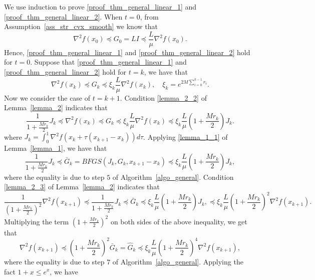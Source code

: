 \documentclass[11pt]{article}
\numberwithin{assumption}{section}
\numberwithin{remark}{section}
\numberwithin{theorem}{section}
\begin{document}
We use induction to prove \eqref{proof_thm_general_linear_1} and \eqref{proof_thm_general_linear_2}. When $t = 0$, from Assumption~\ref{ass_str_cvx_smooth} we know that
\begin{equation}
\nabla^2{f(x_0)} \preceq G_0 = LI \preceq \frac{L}{\mu}\nabla^2{f(x_0)}.
\end{equation}
Hence, \eqref{proof_thm_general_linear_1} and \eqref{proof_thm_general_linear_2} hold for $t = 0$. Suppose that \eqref{proof_thm_general_linear_1} and \eqref{proof_thm_general_linear_2} hold for $t = k$, we have that
\begin{equation}\label{proof_thm_general_linear_3}
    \nabla^2{f(x_k)} \preceq G_k \preceq \xi_k \frac{L}{\mu}\nabla^2{f(x_k)},\quad \xi_k = e^{2M\sum_{i = 0}^{k - 1}r_i}.
\end{equation}
Now we consider the case of $t = k + 1$. Condition \eqref{lemma_2_2} of Lemma~\ref{lemma_2} indicates that
\begin{equation}
    \frac{1}{1 + \frac{Mr_k}{2}}J_k \preceq \nabla^2{f(x_k)} \preceq G_k \preceq \xi_k \frac{L}{\mu}\nabla^2{f(x_k)} \preceq \xi_k \frac{L}{\mu}(1 + \frac{Mr_k}{2})J_k.
\end{equation}
where $J_k = \int_{0}^{1}\nabla^2{f(x_k + \tau(x_{k + 1} - x_k))}d\tau$. Applying \eqref{lemma_1_1} of Lemma~\ref{lemma_1}, we have that
\begin{equation}
    \frac{1}{1 + \frac{Mr_k}{2}}J_k \preceq \bar{G}_k = BFGS(J_k, G_k, x_{k + 1} - x_k) \preceq \xi_k \frac{L}{\mu}(1 + \frac{Mr_k}{2})J_k,
\end{equation}
where the equality is due to step $5$ of Algorithm~\ref{algo_general}. Condition \eqref{lemma_2_3} of Lemma~\ref{lemma_2} indicates that
\begin{equation}
    \frac{1}{(1 + \frac{Mr_k}{2})^2}\nabla^2{f(x_{k + 1})} \preceq \frac{1}{1 + \frac{Mr_k}{2}}J_k \preceq \bar{G}_k \preceq \xi_k \frac{L}{\mu}(1 + \frac{Mr_k}{2})J_k, \preceq \xi_k \frac{L}{\mu}(1 + \frac{Mr_k}{2})^2\nabla^2{f(x_{k + 1})}.
\end{equation}
Multiplying the term $(1 + \frac{Mr_k}{2})^2$ on both sides of the above inequality, we get that
\begin{equation}\label{proof_thm_general_linear_4}
    \nabla^2{f(x_{k + 1})} \preceq (1 + \frac{Mr_k}{2})^2\bar{G}_k = \hat{G}_k \preceq \xi_k \frac{L}{\mu}(1 + \frac{Mr_k}{2})^4\nabla^2{f(x_{k + 1})},
\end{equation}
where the equality is due to step $7$ of Algorithm~\ref{algo_general}. Applying the fact $1 + x \leq e^x$, we have
\end{document}
